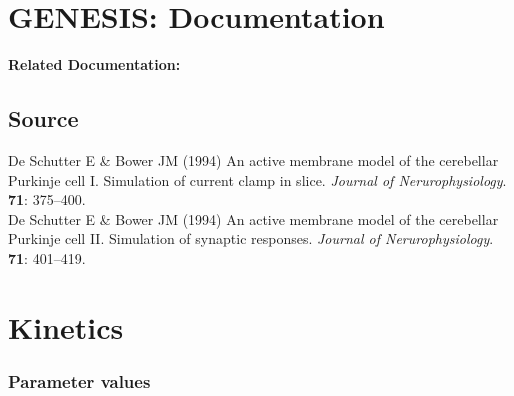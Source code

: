\documentclass[12pt]{article}
\begin{document}
\section*{GENESIS: Documentation}

{\bf Related Documentation:}

\subsection*{Source}

De Schutter E \& Bower JM (1994) An active membrane model of the cerebellar Purkinje cell I. Simulation of current clamp in slice. {\it Journal of Nerurophysiology}. {\bf 71}: 375--400. \\

\noindent De Schutter E \& Bower JM (1994) An active membrane model of the cerebellar Purkinje cell II. Simulation of synaptic responses. {\it Journal of Nerurophysiology}. {\bf 71}: 401--419.

\section*{Kinetics}

\subsubsection*{Parameter values}
\end{document}
